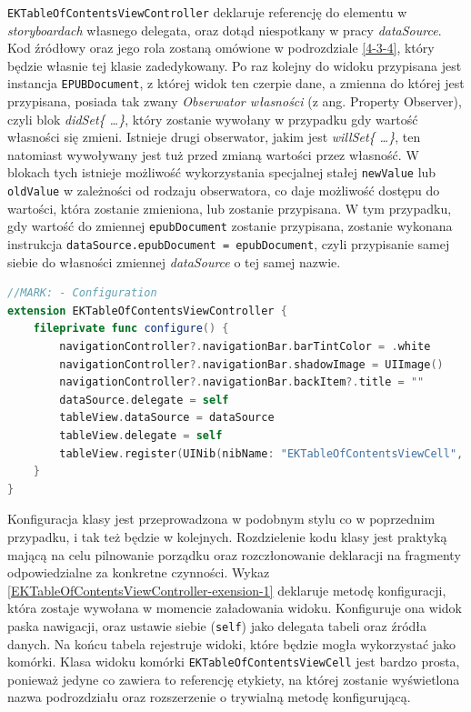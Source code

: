 \texttt{EKTableOfContentsViewController} deklaruje referencję do elementu w \textit{storyboardach} własnego delegata, oraz dotąd niespotkany w pracy \textit{dataSource}. Kod źródłowy oraz jego rola zostaną omówione w podrozdziale \ref{4-3-4}, który będzie własnie tej klasie zadedykowany. Po raz kolejny do widoku przypisana jest instancja \texttt{EPUBDocument}, z której widok ten czerpie dane, a zmienna do której jest przypisana, posiada tak zwany \textit{Obserwator własności} (z ang. Property Observer), czyli blok \textit{didSet\{ \ldots \}}, który zostanie wywołany w przypadku gdy wartość własności się zmieni. Istnieje drugi obserwator, jakim jest \textit{willSet\{ \ldots \}}, ten natomiast wywoływany jest tuż przed zmianą wartości przez własność. W blokach tych istnieje możliwość wykorzystania specjalnej stałej \texttt{newValue} lub \texttt{oldValue} w zależności od rodzaju obserwatora, co daje możliwość dostępu do wartości, która zostanie zmieniona, lub zostanie przypisana. W tym przypadku, gdy wartość do zmiennej \texttt{epubDocument} zostanie przypisana, zostanie wykonana instrukcja \texttt{dataSource.epubDocument = epubDocument}, czyli przypisanie samej siebie do własności zmiennej \textit{dataSource} o tej samej nazwie.

\begin{lstlisting}[language=swift,caption={Rozszerzenie klasy \texttt{EKTableOfContentsViewController} o metodę konfiguracji},label=EKTableOfContentsViewController-exension-1]
//MARK: - Configuration
extension EKTableOfContentsViewController {
    fileprivate func configure() {
        navigationController?.navigationBar.barTintColor = .white
        navigationController?.navigationBar.shadowImage = UIImage()
        navigationController?.navigationBar.backItem?.title = ""
        dataSource.delegate = self
        tableView.dataSource = dataSource
        tableView.delegate = self
        tableView.register(UINib(nibName: "EKTableOfContentsViewCell", bundle: Bundle(for: classForCoder)), forCellReuseIdentifier: "EKTableOfContentsViewCell")
    }
}
\end{lstlisting}

Konfiguracja klasy jest przeprowadzona w podobnym stylu co w poprzednim przypadku, i tak też będzie w kolejnych. Rozdzielenie kodu klasy jest praktyką mającą na celu pilnowanie porządku oraz rozczłonowanie deklaracji na fragmenty odpowiedzialne za konkretne czynności. Wykaz \ref{EKTableOfContentsViewController-exension-1} deklaruje metodę konfiguracji, która zostaje wywołana w momencie załadowania widoku. Konfiguruje ona widok paska nawigacji, oraz ustawie siebie (\texttt{self}) jako delegata tabeli oraz źródła danych. Na końcu tabela rejestruje widoki, które będzie mogła wykorzystać jako komórki. Klasa widoku komórki \texttt{EKTableOfContentsViewCell} jest bardzo prosta, ponieważ jedyne co zawiera to referencję etykiety, na której zostanie wyświetlona nazwa podrozdziału oraz rozszerzenie o trywialną metodę konfigurującą.


